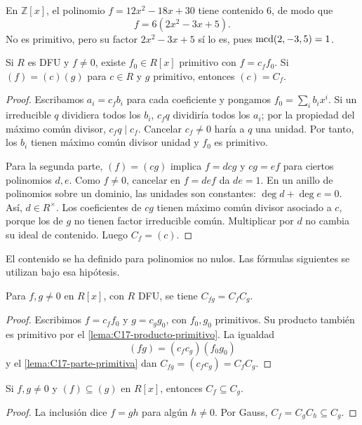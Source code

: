 \begin{ejem}
En $\mathbb Z[x]$, el polinomio $f=12x^2-18x+30$ tiene contenido $6$, de modo que
\[
f=6(2x^2-3x+5).
\]
No es primitivo, pero su factor $2x^2-3x+5$ sí lo es, pues $\operatorname{mcd}(2,-3,5)=1$.
\end{ejem}

\begin{lema}\label{lema:C17-parte-primitiva}
Si $R$ es DFU y $f\ne0$, existe $f_0\in R[x]$ primitivo con $f=c_ff_0$. Si $(f)=(c)(g)$ para $c\in R$ y $g$ primitivo, entonces $(c)=C_f$.
\end{lema}
\begin{proof}
Escribamos $a_i=c_fb_i$ para cada coeficiente y pongamos $f_0=\sum_i b_ix^i$. Si un irreducible $q$ dividiera todos los $b_i$, $c_fq$ dividiría todos los $a_i$; por la propiedad del máximo común divisor, $c_fq\mid c_f$. Cancelar $c_f\ne0$ haría a $q$ una unidad. Por tanto, los $b_i$ tienen máximo común divisor unidad y $f_0$ es primitivo.

Para la segunda parte, $(f)=(cg)$ implica $f=dcg$ y $cg=ef$ para ciertos polinomios $d,e$. Como $f\ne0$, cancelar en $f=def$ da $de=1$. En un anillo de polinomios sobre un dominio, las unidades son constantes: $\deg d+\deg e=0$. Así, $d\in R^\times$. Los coeficientes de $cg$ tienen máximo común divisor asociado a $c$, porque los de $g$ no tienen factor irreducible común. Multiplicar por $d$ no cambia su ideal de contenido. Luego $C_f=(c)$.
\end{proof}
\begin{obs}
El contenido se ha definido para polinomios no nulos. Las fórmulas siguientes se utilizan bajo esa hipótesis.
\end{obs}

\begin{prop}\label{prop:C17-Gauss}
Para $f,g\ne0$ en $R[x]$, con $R$ DFU, se tiene $C_{fg}=C_fC_g$.
\end{prop}
\begin{proof}
Escribimos $f=c_ff_0$ y $g=c_gg_0$, con $f_0,g_0$ primitivos. Su producto también es primitivo por el \cref{lema:C17-producto-primitivo}. La igualdad
\[
(fg)=(c_fc_g)(f_0g_0)
\]
y el \cref{lema:C17-parte-primitiva} dan $C_{fg}=(c_fc_g)=C_fC_g$.
\end{proof}
\begin{coro}\label{coro:C17-contenido-inclusion}
Si $f,g\ne0$ y $(f)\subseteq(g)$ en $R[x]$, entonces $C_f\subseteq C_g$.
\end{coro}
\begin{proof}
La inclusión dice $f=gh$ para algún $h\ne0$. Por Gauss, $C_f=C_gC_h\subseteq C_g$.
\end{proof}

